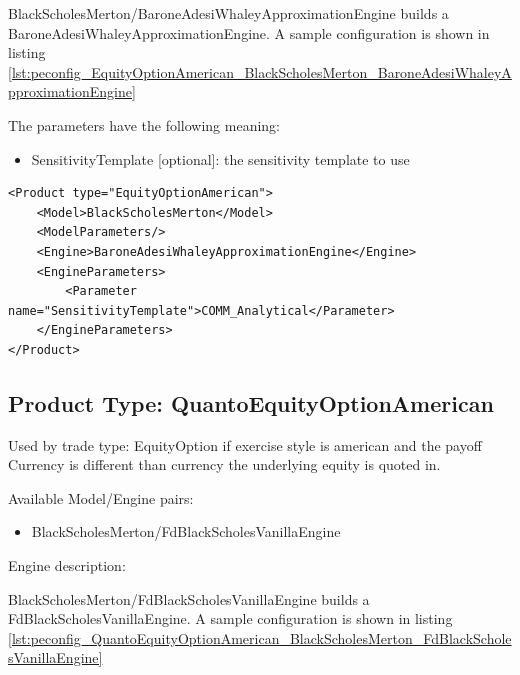 BlackScholesMerton/BaroneAdesiWhaleyApproximationEngine builds a BaroneAdesiWhaleyApproximationEngine. A sample configuration is shown in listing
\ref{lst:peconfig_EquityOptionAmerican_BlackScholesMerton_BaroneAdesiWhaleyApproximationEngine}

The parameters have the following meaning:

\begin{itemize}
\item SensitivityTemplate [optional]: the sensitivity template to use
\end{itemize}

\begin{longlisting}
\begin{verbatim}
<Product type="EquityOptionAmerican">
    <Model>BlackScholesMerton</Model>
    <ModelParameters/>
    <Engine>BaroneAdesiWhaleyApproximationEngine</Engine>
    <EngineParameters>
        <Parameter name="SensitivityTemplate">COMM_Analytical</Parameter>
    </EngineParameters>
</Product>
\end{verbatim}
\caption{Configuration for Product EquityOptionAmerican, Model BlackScholesMerton, Engine BaroneAdesiWhaleyApproximationEngine}
\label{lst:peconfig_EquityOptionAmerican_BlackScholesMerton_BaroneAdesiWhaleyApproximationEngine}
\end{longlisting}

\subsection{Product Type: QuantoEquityOptionAmerican}

Used by trade type: EquityOption if exercise style is american and the payoff Currency is different than currency the underlying equity is quoted in.

Available Model/Engine pairs:

\begin{itemize}
\item BlackScholesMerton/FdBlackScholesVanillaEngine
\end{itemize}

Engine description:

BlackScholesMerton/FdBlackScholesVanillaEngine builds a FdBlackScholesVanillaEngine. A sample configuration is shown in listing
\ref{lst:peconfig_QuantoEquityOptionAmerican_BlackScholesMerton_FdBlackScholesVanillaEngine}

